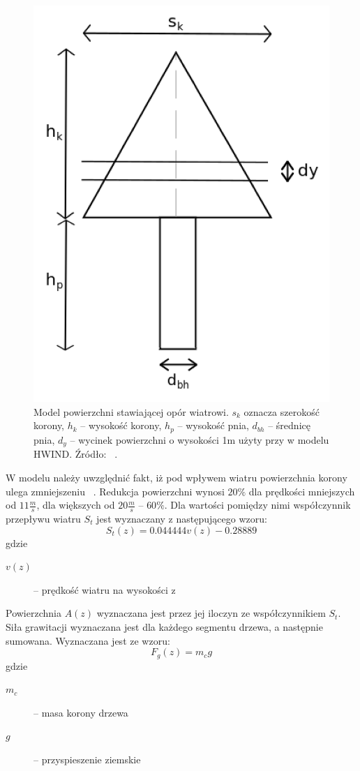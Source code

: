 \begin{figure}[!h]
	\center
	\includegraphics[scale=0.35]{HWIND2}
	\caption{Model powierzchni stawiającej opór wiatrowi. $s_k$ oznacza szerokość korony, $h_k$ -- wysokość korony, $h_p$ -- wysokość pnia, $d_{bh}$ -- średnicę pnia, $d_y$ -- wycinek powierzchni o wysokości 1m użyty przy w modelu HWIND. Źródło: ~\cite{chm_mgza}.}
	\label{fig:HWIND2}
\end{figure} 

W modelu należy uwzględnić fakt, iż pod wpływem wiatru powierzchnia korony ulega zmniejszeniu ~\cite{todo_jakies_zrodlo}. Redukcja powierzchni wynosi $20\%$ dla prędkości mniejszych od $11 \frac{m}{s}$, dla 
większych od $20\frac{m}{s}$ -- $60\%$. Dla wartości pomiędzy nimi współczynnik przepływu wiatru $S_t$ jest wyznaczany z następującego wzoru:
$$ S_t(z) = 0.044444v(z) - 0.28889$$
gdzie
\begin{description}
  \item[$v(z)$] -- prędkość wiatru na wysokości z
\end{description}

Powierzchnia $A(z)$ wyznaczana jest przez jej iloczyn ze współczynnikiem $S_t$.
\\

Siła grawitacji wyznaczana jest dla każdego segmentu drzewa, a następnie sumowana. Wyznaczana jest ze wzoru:
$$F_g(z) = m_c g$$
gdzie
\begin{description}
  \item[$m_c$] -- masa korony drzewa
  \item[$g$] -- przyspieszenie ziemskie
\end{description}
